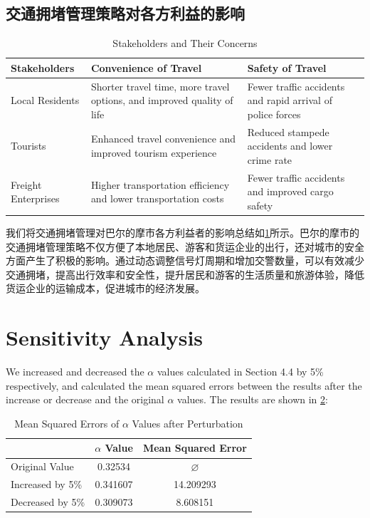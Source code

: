 \documentclass[12pt, a4paper, oneside]{ctexart}
\begin{document}
\subsection{交通拥堵管理策略对各方利益的影响}

\begin{table}[H]
  \centering
  \caption{Stakeholders and Their Concerns}
  \label{tab:stakeholder_concerns}
  \begin{tabularx}{\textwidth}{@{}lXX@{}} %
      \toprule
      \textbf{Stakeholders} & \textbf{Convenience of Travel} & \textbf{Safety of Travel} \\
      \midrule
      Local Residents & Shorter travel time, more travel options, and improved quality of life & Fewer traffic accidents and rapid arrival of police forces \\
      Tourists & Enhanced travel convenience and improved tourism experience & Reduced stampede accidents and lower crime rate \\
      Freight Enterprises & Higher transportation efficiency and lower transportation costs & Fewer traffic accidents and improved cargo safety \\
      \bottomrule
  \end{tabularx}
\end{table}

我们将交通拥堵管理对巴尔的摩市各方利益者的影响总结如\ref{tab:stakeholder_concerns}所示。巴尔的摩市的交通拥堵管理策略不仅方便了本地居民、游客和货运企业的出行，还对城市的安全方面产生了积极的影响。通过动态调整信号灯周期和增加交警数量，可以有效减少交通拥堵，提高出行效率和安全性，提升居民和游客的生活质量和旅游体验，降低货运企业的运输成本，促进城市的经济发展。


\section{Sensitivity Analysis}

We increased and decreased the $\alpha$ values calculated in Section 4.4 by 5\% respectively, and calculated the mean squared errors between the results after the increase or decrease and the original $\alpha$ values. The results are shown in \ref{tab:alpha_mse}:

\begin{table}[H]
    \centering
    \caption{Mean Squared Errors of $\alpha$ Values after Perturbation}
    \label{tab:alpha_mse}
    \begin{tabular}{@{}lcc@{}}
        \toprule
        & \textbf{$\alpha$ Value} & \textbf{Mean Squared Error} \\
        \midrule
        Original Value & 0.32534 & \(\varnothing\) \\
        Increased by 5\% & 0.341607 & 14.209293 \\
        Decreased by 5\% & 0.309073 & 8.608151 \\
        \bottomrule
    \end{tabular}
\end{table}
\end{document}
